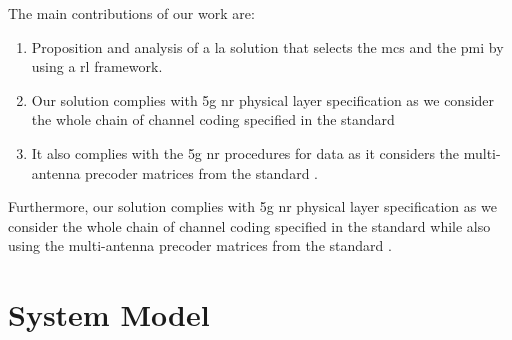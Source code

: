 %
%
%

The main contributions of our work are:
\begin{enumerate}
    \item Proposition and analysis of a \gls{la} solution that selects the \gls{mcs} and the \gls{pmi} by using a \gls{rl} framework.
    \item Our solution complies with \gls{5g} \gls{nr} physical layer specification as we consider the whole chain of channel coding specified in the standard \cite{3gpp.38.212}
    \item It also complies with the \gls{5g} \gls{nr} procedures for data as it considers the multi-antenna precoder matrices from the standard \cite{3gpp.38.214}.
\end{enumerate}
%
Furthermore, our solution complies with \gls{5g} \gls{nr} physical layer specification as we consider the whole chain of channel coding specified in the standard \cite{3gpp.38.212} while also using the multi-antenna precoder matrices from the standard \cite{3gpp.38.214}.


\section{System Model}
\label{sec:la-system-model}

